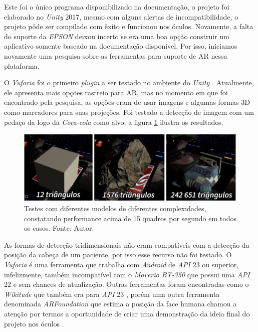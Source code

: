 Este foi o único programa disponibilizado na documentação, o projeto foi elaborado no \textit{Unity} 2017, mesmo com alguns alertas de incompatibilidade, o projeto pôde ser compilado com êxito e funcionou nos óculos. Novamente, a falta do suporte da \textit{EPSON} deixou incerto se era uma boa opção construir um aplicativo somente baseado na documentação disponível. Por isso, iniciamos novamente uma pesquisa sobre as ferramentas para suporte de AR nessa plataforma.

O \textit{Vuforia} foi o primeiro \textit{plugin} a ser testado no ambiente do \textit{Unity} \cite{Vuforia}. Atualmente, ele apresenta mais opções rastreio para AR, mas no momento em que foi encontrado pela pesquisa, as opções eram de usar imagens e algumas formas 3D como marcadores para suas projeções. Foi testado a detecção de imagem com um pedaço da logo da \textit{Coca-cola\texttrademark} como alvo, a figura \ref{fig:vuforia-tests} ilustra os resultados.

\begin{figure}[ht]
    \centering
    \includegraphics[width=.85\linewidth]{figuras/Vuforia.png}
    \caption{Testes com diferentes modelos de diferentes complexidades, constatando performance acima de 15 quadros por segundo em todos os casos. Fonte: Autor.}
    \label{fig:vuforia-tests}
\end{figure}

As formas de detecção tridimensionais não eram compatíveis com a detecção da posição da cabeça de um paciente, por isso esse recurso não foi testado. O \textit{Vuforia} é uma ferramenta que trabalha com \textit{Android} de \textit{API} 23 ou superior, infelizmente, também incompatível com o \textit{Moverio BT-350} que possui uma \textit{API} 22 e sem chances de atualização. Outras ferramentas foram encontradas como o \textit{Wikitude\texttrademark} que também era para \textit{API} 23 \cite{wikitudes}, porém uma outra ferramenta denominada \textit{ARFoundation} que estima a posição da face humana chamou a atenção por termos a oportunidade de criar uma demonstração da ideia final do projeto nos óculos \cite{arfoundation-docs}.

